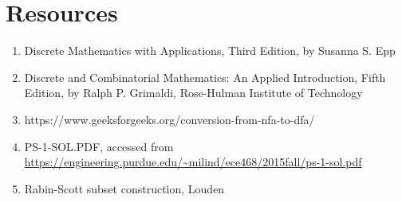 \documentclass{article}
\begin{document}
\section{Resources}
\begin{enumerate}
\item Discrete Mathematics with Applications, Third Edition, by Susanna S. Epp
\item Discrete and Combinatorial Mathematics: An Applied Introduction, Fifth Edition, by Ralph P. Grimaldi, Rose-Hulman Institute of Technology

\item https://www.geeksforgeeks.org/conversion-from-nfa-to-dfa/ 
\item PS-1-SOL.PDF, accessed from \url{https://engineering.purdue.edu/~milind/ece468/2015fall/ps-1-sol.pdf}
\item Rabin-Scott subset construction, Louden
\end{enumerate}
\end{document}
